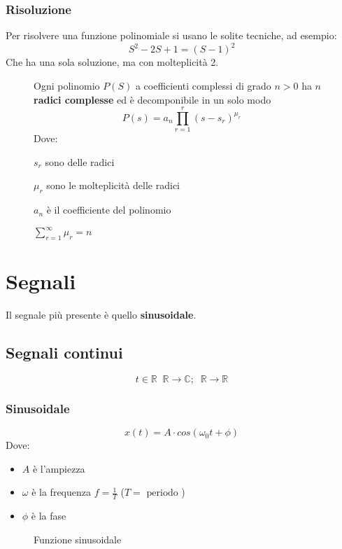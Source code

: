 \documentclass[a4paper]{article}
\begin{document}
\subsubsection{Risoluzione}
Per risolvere una funzione polinomiale si usano le solite tecniche, ad esempio:
\[
S^2-2S+1 = (S-1)^2
\] 
Che ha una sola soluzione, ma con molteplicità 2.

\begin{figure}[H]
  \begin{theorem}
    Ogni polinomio \( P(S) \) a coefficienti complessi di grado \( n > 0 \) ha
    \( n \) \textbf{radici complesse} ed è decomponibile in un solo modo
    \[
      P(s) = a_n \prod_{r=1}^{r} (s - s_r)^{\mu_r}
    \] 
    Dove:

    \noindent
    \( s_r \) sono delle radici

    \noindent \( \mu_r \) sono le molteplicità delle radici

    \noindent \( a_n \) è il coefficiente del polinomio

    \vspace{1em}
    \noindent
    \( \sum_{r=1}^{\infty} \mu_r = n \) 
  \end{theorem}
\end{figure}

\section{Segnali}
Il segnale più presente è quello \textbf{sinusoidale}.
\subsection{Segnali continui}
\[
t \in \mathbb{R}\;\; \mathbb{R} \to \mathbb{C};\;\; \mathbb{R} \to \mathbb{R}
\] 

\subsubsection{Sinusoidale}
\[
x(t) = A \cdot cos(\omega_0 t + \phi) 
\] 
Dove:
\begin{itemize}
  \item \( A \) è l'ampiezza
  \item \( \omega \) è la frequenza \( f = \frac{1}{T} \) (\( T = \text{ periodo} \) )
  \item \( \phi \) è la fase
\end{itemize}

\begin{figure}[H]
  \centering
  \caption{Funzione sinusoidale}
\end{figure}
\end{document}
